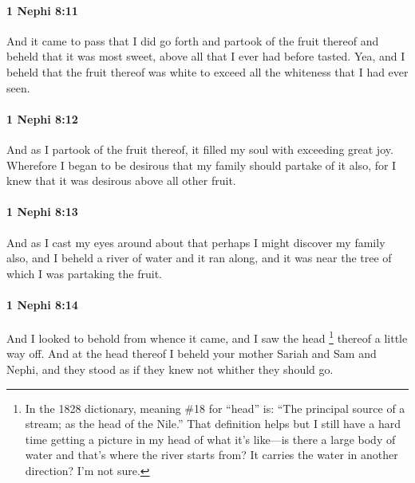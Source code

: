 		\paragraph{1 Nephi 8:11} %
			\label{1NEPHI-8-11}

			And it came to pass that I did go forth and partook of the fruit thereof
			and beheld that it was most sweet, above all that I ever had before tasted.
			Yea, and I beheld that the fruit thereof was white
			to exceed all the whiteness that I had ever seen.

		\paragraph{1 Nephi 8:12} %
			\label{1NEPHI-8-12}

			And as I partook of the fruit thereof,
			it filled my soul with exceeding great joy.
			Wherefore I began to be desirous that my family should partake of it also,
			for I knew that it was desirous above all other fruit.

		\paragraph{1 Nephi 8:13} %
			\label{1NEPHI-8-13}

			And as I cast my eyes around about
			that perhaps I might discover my family also,
			and I beheld a river of water and it ran along,
			and it was near the tree of which I was partaking the fruit.

		\paragraph{1 Nephi 8:14} %
			\label{1NEPHI-8-14}

			And I looked to behold from whence it came,
			and I saw the head%
				\footnote{%
					\label{1NEPHI-8-14-NOTE-head}%
					In the 1828 dictionary, meaning \#18 for ``head'' is: ``The principal source of a stream; as the head of the Nile.'' That definition helps but I still have a hard time getting a picture in my head of what it's like---is there a large body of water and that's where the river starts from? It carries the water in another direction? I'm not sure.
					}
			thereof a little way off.
			And at the head thereof I beheld your mother Sariah and Sam and Nephi,
			and they stood as if they knew not whither they should go.

